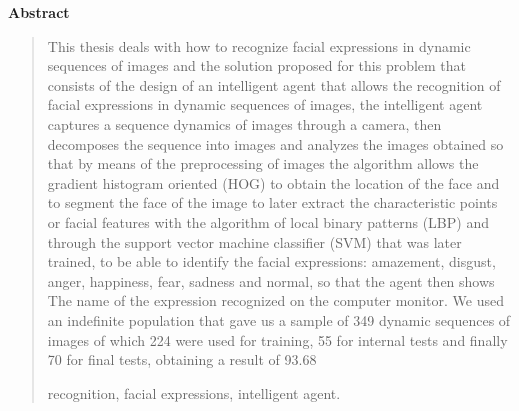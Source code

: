 \newpage
\begin{center}
 {\bf\LARGE Abstract}\vskip 1.5cm
\end{center} 
\begin{quotation}

This thesis deals with how to recognize facial expressions in dynamic sequences of images and the solution proposed for this problem that consists of the design of an intelligent agent that allows the recognition of facial expressions in dynamic sequences of images, the intelligent agent captures a sequence dynamics of images through a camera, then decomposes the sequence into images and analyzes the images obtained so that by means of the preprocessing of images the algorithm allows the gradient histogram oriented (HOG) to obtain the location of the face and to segment the face of the image to later extract the characteristic points or facial features with the algorithm of local binary patterns (LBP) and through the support vector machine classifier (SVM) that was later trained, to be able to identify the facial expressions: amazement, disgust, anger, happiness, fear, sadness and normal, so that the agent then shows The name of the expression recognized on the computer monitor. We used an indefinite population that gave us a sample of 349 dynamic sequences of images of which 224 were used for training, 55 for internal tests and finally 70 for final tests, obtaining a result of 93.68%


\vskip 0.3cm
\hspace*{-0.6cm}{\bf Keywords:} recognition, facial expressions, intelligent agent.
\end{quotation}

